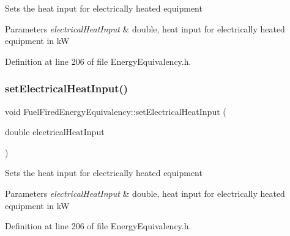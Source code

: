 Sets the heat input for electrically heated equipment


\begin{DoxyParams}{Parameters}
{\em electrical\+Heat\+Input} & double, heat input for electrically heated equipment in kW \\
\hline
\end{DoxyParams}


Definition at line 206 of file Energy\+Equivalency.\+h.

\mbox{\label{class_fuel_fired_energy_equivalency_a222836bfef1cb0caec0adafc2ef6b7ea}} 
\subsubsection{\texorpdfstring{set\+Electrical\+Heat\+Input()}{setElectricalHeatInput()}\hspace{0.1cm}{\footnotesize\ttfamily [2/3]}}
{\footnotesize\ttfamily void Fuel\+Fired\+Energy\+Equivalency\+::set\+Electrical\+Heat\+Input (\begin{DoxyParamCaption}\item[{double}]{electrical\+Heat\+Input }\end{DoxyParamCaption})\hspace{0.3cm}{\ttfamily [inline]}}

Sets the heat input for electrically heated equipment


\begin{DoxyParams}{Parameters}
{\em electrical\+Heat\+Input} & double, heat input for electrically heated equipment in kW \\
\hline
\end{DoxyParams}


Definition at line 206 of file Energy\+Equivalency.\+h.

\mbox{\label{class_fuel_fired_energy_equivalency_a222836bfef1cb0caec0adafc2ef6b7ea}} 

